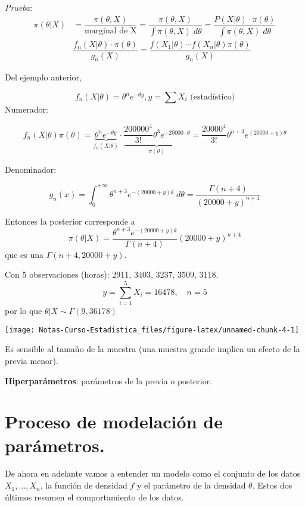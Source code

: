 \documentclass[
  12pt,
]{book}
\begin{document}
\emph{Prueba}:
\begin{align*}
\pi(\theta|X) & = \dfrac{\pi(\theta,X)}{\text{marginal de X}} = \dfrac{\pi(\theta,X)}{\int \pi(\theta,X)\;d\theta}= \dfrac{P(X|\theta)\cdot \pi(\theta)}{\int \pi(\theta,X)\;d\theta}\\
& \dfrac{f_n(X|\theta)\cdot \pi(\theta)}{g_n(X)} = \dfrac{f(X_1|\theta)\cdots f(X_n|\theta)\pi(\theta)}{g_n(X)}
\end{align*}

Del ejemplo anterior,

\[f_n(X|\theta) = \theta^n e^{-\theta y}, y = \sum{X_i} \text{ (estadístico})\]
Numerador:

\[f_n(X|\theta)\pi(\theta) = \underbrace{\theta^n e^{-\theta y}}_{f_n(X|\theta)} \cdot \underbrace{\dfrac{200000^4}{3!}\theta^3e^{-20000\cdot\theta}}_{\pi(\theta)} = \dfrac{20000^4}{3!}\theta^{n+3}e^{(20000+y)\theta}\]

Denominador:

\[g_n(x) = \int_{0}^{+\infty}\theta^{n+3}e^{-(20000+y)\theta}\;d\theta = \dfrac{\Gamma(n+4)}{(20000+y)^{n+4}}\]

Entonces la posterior corresponde a
\[\pi(\theta|X) = \dfrac{\theta^{n+3}e^{-(20000+y)\theta}}{\Gamma(n+4)} (20000+y)^{n+4}\]
que es una \(\Gamma(n+4,20000+y)\).

Con 5 observaciones (horas): 2911, 3403, 3237, 3509, 3118.
\[y = \sum_{i=1}^{5}X_i = 16478, \quad n= 5\]
por lo que \(\theta|X \sim \Gamma(9,36178)\)

\begin{center}\texttt{[image: Notas-Curso-Estadistica\_files/figure-latex/unnamed-chunk-4-1]} \end{center}

Es sensible al tamaño de la muestra (una muestra grande implica un efecto de la previa menor).

\textbf{Hiperparámetros}: parámetros de la previa o posterior.

\hypertarget{proceso-de-modelaciuxf3n-de-paruxe1metros.}{%
\section{Proceso de modelación de parámetros.}\label{proceso-de-modelaciuxf3n-de-paruxe1metros.}}

De ahora en adelante vamos a entender un modelo como el conjunto de los datos
\(X_1, \ldots, X_n\), la función de densidad \(f\) y el parámetro de la densidad
\(\theta\). Estos dos últimos resumen el comportamiento de los datos.
\end{document}
